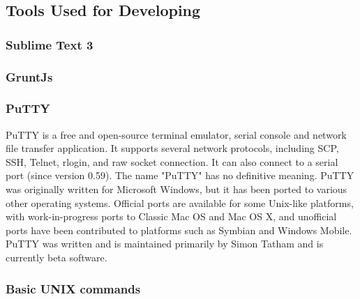 \subsection{Tools Used for Developing}
\subsubsection{Sublime Text 3}
\subsubsection{GruntJs}
\subsubsection{PuTTY}
PuTTY  is a free and open-source terminal emulator, serial console and network file transfer application. It supports several network protocols, including SCP, SSH, Telnet, rlogin, and raw socket connection. It can also connect to a serial port (since version 0.59). The name "PuTTY" has no definitive meaning.
PuTTY was originally written for Microsoft Windows, but it has been ported to various other operating systems. Official ports are available for some Unix-like platforms, with work-in-progress ports to Classic Mac OS and Mac OS X, and unofficial ports have been contributed to platforms such as Symbian and Windows Mobile.
PuTTY was written and is maintained primarily by Simon Tatham and is currently beta software.
\subsubsection{Basic UNIX commands}
